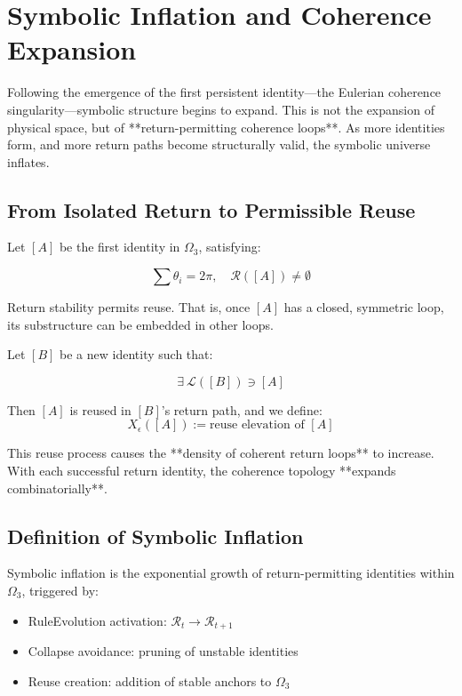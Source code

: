 \chapter{Symbolic Inflation and Coherence Expansion} \label{chapter:symbolic-inflation}

Following the emergence of the first persistent identity—the Eulerian coherence singularity—symbolic structure begins to expand. This is not the expansion of physical space, but of **return-permitting coherence loops**. As more identities form, and more return paths become structurally valid, the symbolic universe inflates.

\section{From Isolated Return to Permissible Reuse}

Let $[A]$ be the first identity in $\Omega_3$, satisfying:

\[
\sum \theta_i = 2\pi, \quad \mathcal{R}([A]) \ne \emptyset
\]

Return stability permits reuse. That is, once $[A]$ has a closed, symmetric loop, its substructure can be embedded in other loops.

\begin{definition}
Let $[B]$ be a new identity such that:

\[
\exists\ \mathcal{L}([B]) \ni [A]
\]

Then $[A]$ is reused in $[B]$’s return path, and we define:
\[
X_\epsilon([A]) := \text{reuse elevation of } [A]
\]
\end{definition}

This reuse process causes the **density of coherent return loops** to increase. With each successful return identity, the coherence topology **expands combinatorially**.

\section{Definition of Symbolic Inflation}

\begin{definition}
Symbolic inflation is the exponential growth of return-permitting identities within $\Omega_3$, triggered by:
\begin{itemize}
  \item RuleEvolution activation: $\mathcal{R}_t \to \mathcal{R}_{t+1}$
  \item Collapse avoidance: pruning of unstable identities
  \item Reuse creation: addition of stable anchors to $\Omega_3$
\end{itemize}
\end{definition}


